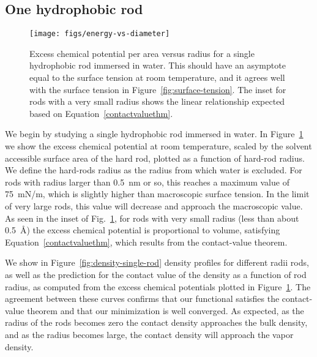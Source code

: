 \documentclass[twocolumn,amsmath,amssymb,prl]{revtex4-1}
\begin{document}
\subsection{One hydrophobic rod}

\begin{figure}
\begin{center}
\texttt{[image: figs/energy-vs-diameter]}
\end{center}
\caption{ Excess chemical potential per area versus radius for a single
hydrophobic rod immersed in water. This should have an asymptote equal
to the surface tension at room temperature, and it agrees well with
the surface tension in Figure~\ref{fig:surface-tension}. The inset for
rods with a very small radius shows the linear relationship expected based on
Equation~\ref{contactvaluethm}.}
\label{fig:energy-vs-diameter}
\end{figure}

We begin by studying a single hydrophobic rod immersed in water.
In Figure~\ref{fig:energy-vs-diameter} we show the excess chemical
potential at room temperature, scaled by the solvent accessible
surface area of the hard rod, plotted as a function of hard-rod
radius.  We define the hard-rods radius as the radius from which water
is excluded.  For rods with radius larger than 0.5~nm or so, this
reaches a maximum value of 75~mN/m, which is slightly higher than
macroscopic surface tension.  In the limit of very large rods, this
value will decrease and approach the macroscopic value.  As seen in
the inset of Fig.~\ref{fig:energy-vs-diameter}, for rods with very
small radius (less than about 0.5~\AA) the excess chemical potential
is proportional to volume, satisfying Equation~\ref{contactvaluethm},
which results from the contact-value theorem.

We show in Figure~\ref{fig:density-single-rod} density profiles for
different radii rods, as well as the prediction for the contact value
of the density as a function of rod radius, as computed from the
excess chemical potentials plotted in
Figure~\ref{fig:energy-vs-diameter}.  The agreement between these
curves confirms that our functional satisfies the contact-value
theorem and that our minimization is well converged.  As expected, as
the radius of the rods becomes zero the contact density approaches the
bulk density, and as the radius becomes large, the contact density
will approach the vapor density.
\end{document}
